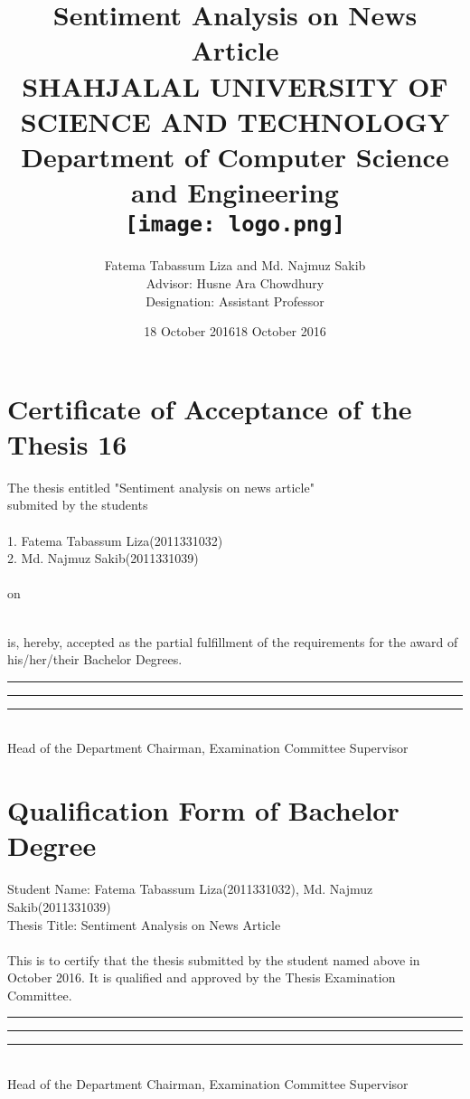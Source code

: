 \documentclass[a4paper,12pt]{report}
\title{
    {Sentiment Analysis on News Article}\\
    {\large SHAHJALAL UNIVERSITY OF SCIENCE AND TECHNOLOGY}\\
    {Department of Computer Science and Engineering}\\
    \vspace{1.2in}
    {\texttt{[image: logo.png]}}
}
\author{Fatema Tabassum Liza and Md. Najmuz Sakib \\
Advisor: Husne Ara Chowdhury \\
Designation: Assistant Professor }
\date{18 October 2016}
\begin{document}
\maketitle
{}

\chapter*{Certificate of Acceptance of the Thesis 16}
The thesis entitled  "Sentiment analysis on news article" \\
submited by the students \\
\\
1. Fatema Tabassum Liza(2011331032) \\
2. Md. Najmuz Sakib(2011331039)  \\
\\
on \date{18 October 2016} \\
is, hereby, accepted as the partial fulfillment of the requirements for the award of his/her/their Bachelor Degrees.

\vspace{8cm} 

\noindent\rule{4.1cm}{0.4pt} \hspace{2cm} \noindent\rule{4.5cm}{0.4pt}  \hspace{1.4cm} \noindent\rule{3cm}{0.4pt}  \\
Head of the Department \hspace{1cm} Chairman, Examination Committee   \hspace{1cm} Supervisor
    
\chapter*{Qualification Form of Bachelor Degree}
    Student Name: Fatema Tabassum Liza(2011331032), Md. Najmuz Sakib(2011331039) \\
    Thesis Title: Sentiment Analysis on News Article \\\\
    This is to certify that the thesis submitted by the student named above in October 2016. It is qualified and approved by the Thesis Examination Committee.
  
\vspace{8cm} 

\noindent\rule{4.1cm}{0.4pt} \hspace{2cm} \noindent\rule{4.5cm}{0.4pt}  \hspace{1.4cm} \noindent\rule{3cm}{0.4pt}  \\
Head of the Department \hspace{1cm} Chairman, Examination Committee   \hspace{1cm} Supervisor
\end{document}
